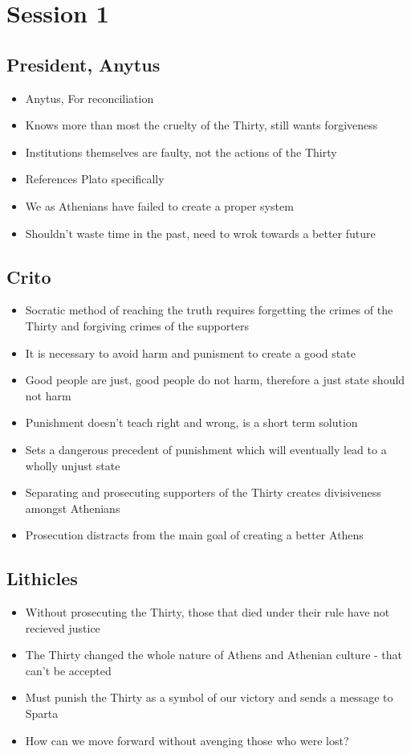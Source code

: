 \documentclass[11pt]{article}
\begin{document}
\section{Session 1}
\label{sec:org3b80f6e}
\subsection{President, Anytus}
\label{sec:org8dccb06}
\begin{itemize}
\item Anytus, For reconciliation
\item Knows more than most the cruelty of the Thirty, still wants forgiveness
\item Institutions themselves are faulty, not the actions of the Thirty
\item References Plato specifically
\item We as Athenians have failed to create a proper system
\item Shouldn't waste time in the past, need to wrok towards a better future
\end{itemize}
\subsection{Crito}
\label{sec:org62892fb}
\begin{itemize}
\item Socratic method of reaching the truth requires forgetting the crimes of the Thirty and forgiving
crimes of the supporters
\item It is necessary to avoid harm and punisment to create a good state
\item Good people are just, good people do not harm, therefore a just state should not harm
\item Punishment doesn't teach right and wrong, is a short term solution
\item Sets a dangerous precedent of punishment which will eventually lead to a wholly unjust state
\item Separating and prosecuting supporters of the Thirty creates divisiveness amongst Athenians
\item Prosecution distracts from the main goal of creating a better Athens
\end{itemize}
\subsection{Lithicles}
\label{sec:org5e6a8d5}
\begin{itemize}
\item Without prosecuting the Thirty, those that died under their rule have not recieved justice
\item The Thirty changed the whole nature of Athens and Athenian culture - that can't be accepted
\item Must punish the Thirty as a symbol of our victory and sends a message to Sparta
\item How can we move forward without avenging those who were lost?
\end{itemize}
\end{document}
